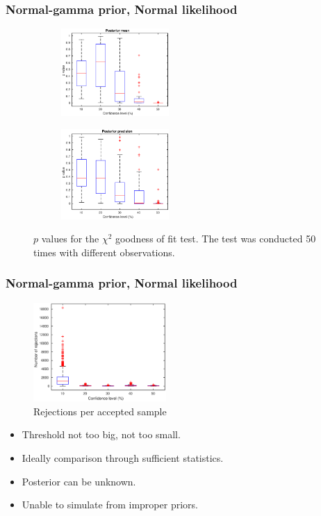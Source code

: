 \documentclass{beamer}
\begin{document}
\begin{frame}
\frametitle{Normal-gamma prior, Normal likelihood}
\begin{figure}
\centering
\begin{subfigure}
\centering
\includegraphics[width=0.45\textwidth]{pvalue_mean.eps}
\end{subfigure}
\begin{subfigure}
\centering
\includegraphics[width=0.45\textwidth]{pvalue_precision.eps}
\end{subfigure}
\caption{$p$ values for the $\chi^2$ goodness of fit test. The test was conducted 50 times with different observations.}
\end{figure}
\end{frame}

\begin{frame}
\frametitle{Normal-gamma prior, Normal likelihood}
\begin{figure}
\centering
\includegraphics[width=0.45\textwidth]{rejections.eps}
\caption{Rejections per accepted sample}
\end{figure}
\end{frame}

\begin{frame}
\begin{itemize}
\item Threshold not too big, not too small.
\item Ideally comparison through sufficient statistics.
\item Posterior can be unknown.
\item Unable to simulate from improper priors.
\end{itemize}
\end{frame}
\end{document}
